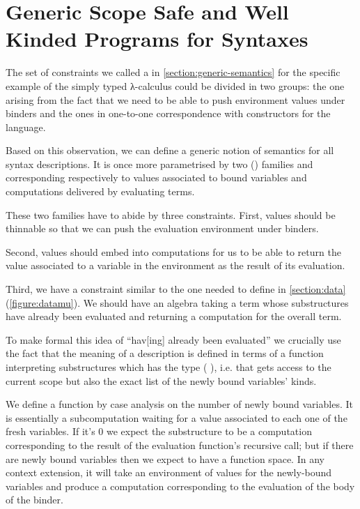\chapter{Generic Scope Safe and Well Kinded Programs for Syntaxes}\label{chapter:generic-semantics}

The set of constraints we called a  in
\cref{section:generic-semantics} for the specific example of the
simply typed λ-calculus could be divided in two groups: the one
arising from the fact that we need to be able to push environment
values under binders and the ones in one-to-one correspondence
with constructors for the language.

Based on this observation, we can define a generic notion of semantics
for all syntax descriptions. It is once more parametrised by two
{()} families  and  corresponding
respectively to values associated to bound variables and computations
delivered by evaluating terms.

{
\label{defn:Semantics}
}

These two families have to abide by three constraints. First, values
should be thinnable so that we can push the evaluation environment
under binders.


Second, values should embed into computations for us to be able to
return the value associated to a variable in the environment as the
result of its evaluation.


Third, we have a constraint similar to the one needed to define  in
\cref{section:data} (\cref{figure:datamu}). We should have an algebra taking
a term whose substructures have already been evaluated and returning a
computation for the overall term.


To make formal this idea of ``hav[ing] already been evaluated'' we crucially use
the fact that the meaning of a description is defined in terms of a function
interpreting substructures which has the type (   ),
i.e. that gets access to the current scope but also the exact list of the newly
bound variables' kinds.

We define a function  by case analysis on the number of newly bound
variables. It is essentially a subcomputation waiting for a value associated to
each one of the fresh variables. If it's $0$ we expect the substructure to be a
computation corresponding to the result of the evaluation function's recursive
call; but if there are newly bound variables then we expect to have a function
space. In any context extension, it will take an environment of values for the
newly-bound variables and produce a computation corresponding to the evaluation
of the body of the binder.

